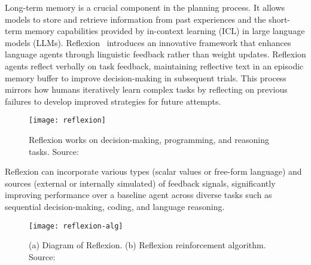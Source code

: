 Long-term memory is a crucial component in the planning process.
It allows models to store and retrieve information from past experiences and the short-term memory capabilities provided by in-context learning (ICL) in large language models (LLMs).
Reflexion~\cite{shinn2023reflexion} introduces an innovative framework that enhances language agents through linguistic feedback rather than weight updates.
Reflexion agents reflect verbally on task feedback, maintaining reflective text in an episodic memory buffer to improve decision-making in subsequent trials.
This process mirrors how humans iteratively learn complex tasks by reflecting on previous failures to develop improved strategies for future attempts.

\begin{figure}[h!]
	\centering
	\texttt{[image: reflexion]}
	\caption{Reflexion works on decision-making, programming, and reasoning tasks. Source: \textcite{shinn2023reflexion}}
	\label{fig:reflexion}
\end{figure}

Reflexion can incorporate various types (scalar values or free-form language) and sources (external or internally simulated) of feedback signals, significantly improving performance over a baseline agent across diverse tasks such as sequential decision-making, coding, and language reasoning.

\begin{figure}[h!]
	\centering
	\texttt{[image: reflexion-alg]}
	\caption{(a) Diagram of Reflexion. (b) Reflexion reinforcement algorithm. Source: \textcite{shinn2023reflexion}}
	\label{fig:reflexion-alg}
\end{figure}

